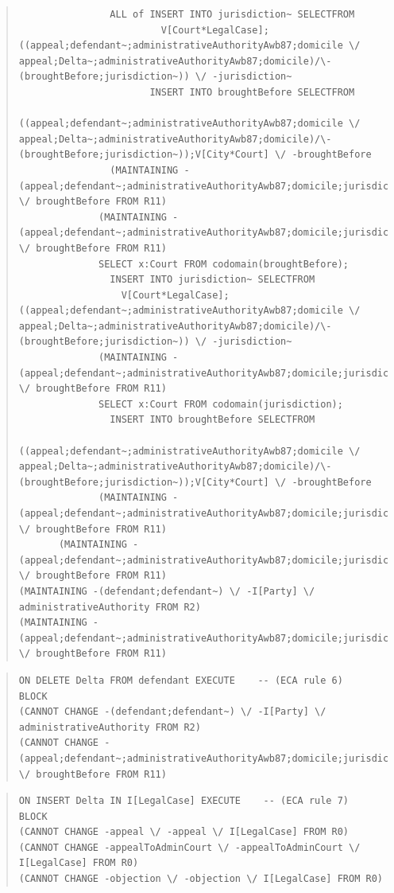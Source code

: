 \documentclass[10pt,a4paper]{report}              %
\theoremstyle{plain}\theorembodyfont{\rmfamily}\newtheorem{definition}{Definition}[section]
\theoremstyle{plain}\theorembodyfont{\rmfamily}\newtheorem{designrule}[definition]{Requirement}
\begin{document}
\begin{quote}
\begin{verbatim}
                ALL of INSERT INTO jurisdiction~ SELECTFROM
                         V[Court*LegalCase];((appeal;defendant~;administrativeAuthorityAwb87;domicile \/ appeal;Delta~;administrativeAuthorityAwb87;domicile)/\-(broughtBefore;jurisdiction~)) \/ -jurisdiction~
                       INSERT INTO broughtBefore SELECTFROM
                         ((appeal;defendant~;administrativeAuthorityAwb87;domicile \/ appeal;Delta~;administrativeAuthorityAwb87;domicile)/\-(broughtBefore;jurisdiction~));V[City*Court] \/ -broughtBefore
                (MAINTAINING -(appeal;defendant~;administrativeAuthorityAwb87;domicile;jurisdiction) \/ broughtBefore FROM R11)
              (MAINTAINING -(appeal;defendant~;administrativeAuthorityAwb87;domicile;jurisdiction) \/ broughtBefore FROM R11)
              SELECT x:Court FROM codomain(broughtBefore);
                INSERT INTO jurisdiction~ SELECTFROM
                  V[Court*LegalCase];((appeal;defendant~;administrativeAuthorityAwb87;domicile \/ appeal;Delta~;administrativeAuthorityAwb87;domicile)/\-(broughtBefore;jurisdiction~)) \/ -jurisdiction~
              (MAINTAINING -(appeal;defendant~;administrativeAuthorityAwb87;domicile;jurisdiction) \/ broughtBefore FROM R11)
              SELECT x:Court FROM codomain(jurisdiction);
                INSERT INTO broughtBefore SELECTFROM
                  ((appeal;defendant~;administrativeAuthorityAwb87;domicile \/ appeal;Delta~;administrativeAuthorityAwb87;domicile)/\-(broughtBefore;jurisdiction~));V[City*Court] \/ -broughtBefore
              (MAINTAINING -(appeal;defendant~;administrativeAuthorityAwb87;domicile;jurisdiction) \/ broughtBefore FROM R11)
       (MAINTAINING -(appeal;defendant~;administrativeAuthorityAwb87;domicile;jurisdiction) \/ broughtBefore FROM R11)
(MAINTAINING -(defendant;defendant~) \/ -I[Party] \/ administrativeAuthority FROM R2)
(MAINTAINING -(appeal;defendant~;administrativeAuthorityAwb87;domicile;jurisdiction) \/ broughtBefore FROM R11)
\end{verbatim}
\end{quote}
\begin{quote}
\begin{verbatim}
ON DELETE Delta FROM defendant EXECUTE    -- (ECA rule 6)
BLOCK
(CANNOT CHANGE -(defendant;defendant~) \/ -I[Party] \/ administrativeAuthority FROM R2)
(CANNOT CHANGE -(appeal;defendant~;administrativeAuthorityAwb87;domicile;jurisdiction) \/ broughtBefore FROM R11)
\end{verbatim}
\end{quote}
\begin{quote}
\begin{verbatim}
ON INSERT Delta IN I[LegalCase] EXECUTE    -- (ECA rule 7)
BLOCK
(CANNOT CHANGE -appeal \/ -appeal \/ I[LegalCase] FROM R0)
(CANNOT CHANGE -appealToAdminCourt \/ -appealToAdminCourt \/ I[LegalCase] FROM R0)
(CANNOT CHANGE -objection \/ -objection \/ I[LegalCase] FROM R0)
\end{verbatim}
\end{quote}
\end{document}
